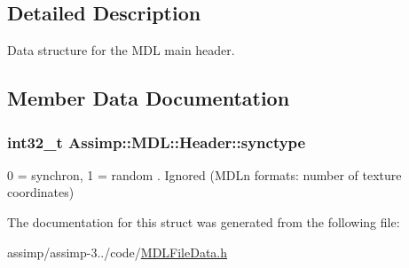 \subsection{Detailed Description}
Data structure for the M\+D\+L main header. 

\subsection{Member Data Documentation}
\hypertarget{struct_assimp_1_1_m_d_l_1_1_header_aa04755f2f2d55249fa52f5a8b5f7ad4c}{
\subsubsection[{synctype}]{\setlength{\rightskip}{0pt plus 5cm}int32\+\_\+t Assimp\+::\+M\+D\+L\+::\+Header\+::synctype}}\label{struct_assimp_1_1_m_d_l_1_1_header_aa04755f2f2d55249fa52f5a8b5f7ad4c}
0 = synchron, 1 = random . Ignored (M\+D\+Ln formats\+: number of texture coordinates) 

The documentation for this struct was generated from the following file\+:\begin{DoxyCompactItemize}
\item 
assimp/assimp-\/3../code/\hyperlink{_m_d_l_file_data_8h}{M\+D\+L\+File\+Data.\+h}\end{DoxyCompactItemize}
